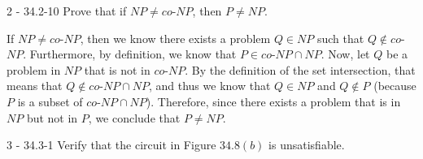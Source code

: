 \documentclass[11pt]{article}
\begin{document}
\begin{prob}{2 - 34.2-10}
Prove that if $NP \not= co$-$NP$, then $P \not= NP$.
\end{prob}
\begin{sol}
If $NP \not= co$-$NP$, then we know there exists a problem $Q \in NP$ such that $Q \notin co$-$NP$.  Furthermore, by definition, we know that $P \in co$-$NP \cap NP$. Now, let $Q$ be a problem in $NP$ that is not in $co$-$NP$. By the definition of the set intersection, that means that $Q \notin co$-$NP \cap NP$, and thus we know that $Q \in NP$ and $Q \notin P$ (because $P$ is a subset of $co$-$NP \cap NP$). Therefore, since there exists a problem that is in $NP$ but not in $P$, we conclude that $P \not= NP$. 
\end{sol}

\begin{prob}{3 - 34.3-1}
Verify that the circuit in Figure $34.8(b)$ is unsatisfiable.
\end{prob}
\end{document}
